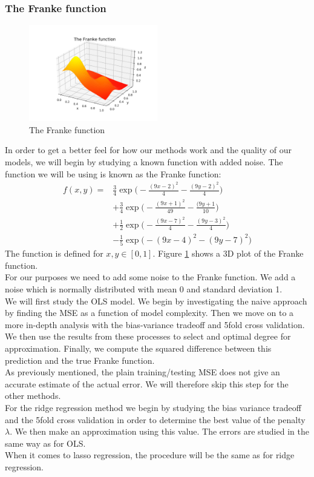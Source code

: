 \documentclass[notitlepage, reprint, nofootinbib]{revtex4-1}
\begin{document}
\subsubsection{The Franke function}
\begin{figure}
	\centering 
	\includegraphics[width=0.5\textwidth]{../Figures/franke_function.png}
	\caption{The Franke function}
	\label{frankefunc}
\end{figure}
In order to get a better feel for how our methods work and the quality of our models, we will begin by studying a known function with added noise. The function we will be using is known as the Franke function: 
\begin{align}
	f(x,y)=&\frac{3}{4}\exp\Big(-\frac{(9x-2)^2}{4}-\frac{(9y-2)^2}{4}\Big)\nonumber\\
	&+\frac{3}{4}\exp\Big(-\frac{(9x+1)^2}{49}-\frac{(9y+1}{10}\Big)\nonumber\\
	&+\frac{1}{2}\exp\Big(-\frac{(9x-7)^2}{4}-\frac{(9y-3)^2}{4}\Big)\nonumber\\
	&-\frac{1}{5}\exp\Big(-(9x-4)^2-(9y-7)^2\Big)
\end{align} 
The function is defined for $x,y\in [0,1]$. Figure \ref{frankefunc} shows a 3D plot of the Franke function. \\[2mm]
For our purposes we need to add some noise to the Franke function. We add a noise which is normally distributed with mean 0 and standard deviation 1.\\[2mm]
We will first study the OLS model. We begin by investigating the naive approach by finding the MSE as a function of model complexity. Then we move on to a more in-depth analysis with the bias-variance tradeoff and 5fold cross validation. We then use the results from these processes to select and optimal degree for approximation. Finally, we compute the squared difference between this prediction and the true Franke function.\\[2mm]
As previously mentioned, the plain training/testing MSE does not give an accurate estimate of the actual error. We will therefore skip this step for the other methods. \\[2mm]
For the ridge regression method we begin by studying the bias variance tradeoff and the 5fold cross validation in order to determine the best value of the penalty $\lambda$. We then make an approximation using this value. The errors are studied in the same way as for OLS. \\[2mm]
When it comes to lasso regression, the procedure will be the same as for ridge regression.
\newpage
\end{document}
